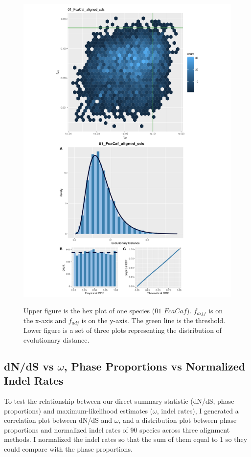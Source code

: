 \begin{figure}[H]
     \centering
     \begin{minipage}[t]{1\textwidth}
     \includegraphics[width=1\linewidth, height=1.3\linewidth]{Fig1.pdf}
      { {Upper figure is the hex plot of one species ($01\_FcaCaf$). $f_{diff}$ is on the x-axis and $f_{adj}$ is on the y-axis. The green line is the threshold. Lower figure is a set of three plots representing the distribution of evolutionary distance.}
      \par}
      \end{minipage}
\end{figure}

\newpage
\subsection{dN/dS vs $\omega$, Phase Proportions vs Normalized Indel Rates}
To test the relationship between our direct summary statistic (dN/dS, phase proportions) and maximum-likelihood estimates ($\omega$, indel rates), I generated a correlation plot between dN/dS and $\omega$, and a distribution plot between phase proportions and normalized indel rates of 90 species across three alignment methods. I normalized the indel rates so that the sum of them equal to 1 so they could compare with the phase proportions. 

